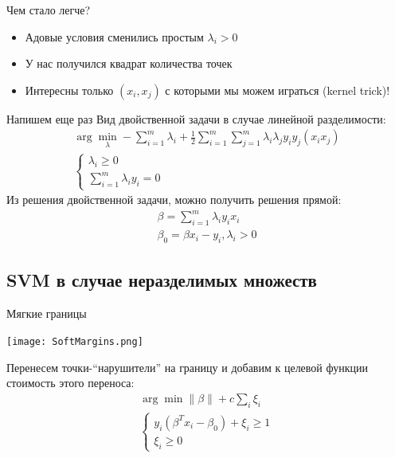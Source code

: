 \documentclass[14pt, fleqn, xcolor={dvipsnames, table}]{beamer}
\begin{document}
\begin{frame}{Чем стало легче?}
\begin{itemize}
  \item Адовые условия сменились простым $\lambda_i > 0$
  \item У нас получился квадрат количества точек
  \item Интересны только $(x_i, x_j)$ с которыми мы можем играться (kernel trick)!
\end{itemize}
\end{frame}
\begin{frame}{Напишем еще раз}
Вид двойственной задачи в случае линейной разделимости:
$$\begin{array}{l}
\arg \min_\lambda -\sum_{i=1}^m\lambda_i + \frac{1}{2}\sum_{i=1}^m\sum_{j=1}^m\lambda_i\lambda_j y_i y_j (x_i x_j) \\ 
\left\{  
  \begin{array}{ll}  
  \lambda_i \ge 0 & \\
  \sum_{i=1}^m\lambda_i y_i = 0
  \end{array}   
  \right.
\end{array}$$
Из решения двойственной задачи, можно получить решения прямой:
$$\begin{array}{l}
\beta = \sum_{i=1}^m\lambda_i y_i x_i \\
\beta_0 = \beta x_i - y_i, \lambda_i > 0
\end{array}$$
\end{frame}

\subsection{SVM в случае неразделимых множеств} %

\begin{frame}{Мягкие границы}
\begin{center}
\texttt{[image: SoftMargins.png]}
\end{center}
Перенесем точки-``нарушители'' на границу и добавим к целевой функции стоимость этого переноса:
$$\begin{array}{l}
\arg \min \|\beta\| + c\sum_i \xi_i \\
\left\{\begin{array}{l}
y_i(\beta^T x_i - \beta_0) + \xi_i \ge 1 \\
\xi_i \ge 0
\end{array}\right.
\end{array}$$
\end{frame}
\end{document}
